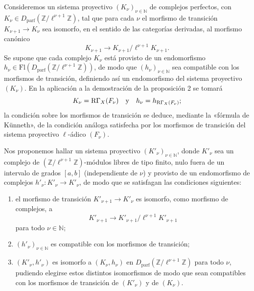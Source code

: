 Consideremos un sistema proyectivo $(K_\nu)_{\nu\in\mathbb N}$ de complejos perfectos, con $K_\nu\in D_{\mathrm{parf}}(\mathbb Z/\ell^{\nu+1}\mathbb Z)$, tal que para cada $\nu$ el morfismo de transición $K_{\nu+1}\to K_\nu$ sea isomorfo, en el sentido de las categorías derivadas, al morfismo canónico
\[
K_{\nu+1}\to K_{\nu+1}/\ell^{\nu+1}K_{\nu+1}.
\]
Se supone que cada complejo $K_\nu$ está provisto de un endomorfismo $h_\nu\in\mathrm{Fl}(D_{\mathrm{parf}}(\mathbb Z/\ell^{\nu+1}\mathbb Z))$, de modo que $(h_\nu)_{\nu\in\mathbb N}$ sea compatible con los morfismos de transición, definiendo así un endomorfismo del sistema proyectivo $(K_\nu)$. En la aplicación a la demostración de la proposición 2 se tomará
\[
K_\nu=\mathrm{R}\Gamma_X(F_\nu)\quad\text{y}\quad h_\nu=h_{\mathrm{R}\Gamma_X(F_\nu)};
\]
la condición sobre los morfismos de transición se deduce, mediante la «fórmula de Künneth», de la condición análoga satisfecha por los morfismos de transición del sistema proyectivo $\ell$-ádico $(F_\nu)$.

Nos proponemos hallar un sistema proyectivo $(K'_\nu)_{\nu\in\mathbb N}$, donde $K'_\nu$ sea un complejo de $(\mathbb Z/\ell^{\nu+1}\mathbb Z)$-módulos libres de tipo finito, nulo fuera de un intervalo de grados $[a,b]$ (independiente de $\nu$) y provisto de un endomorfismo de complejos $h'_\nu:K'_\nu\to K'_\nu$, de modo que se satisfagan las condiciones siguientes:
\begin{enumerate}[label=\arabic*)]
\item el morfismo de transición $K'_{\nu+1}\to K'_\nu$ es isomorfo, como morfismo de complejos, a
\[
K'_{\nu+1}\to K'_{\nu+1}/\ell^{\nu+1}K'_{\nu+1}
\]
para todo $\nu\in\mathbb N$;
\item $(h'_\nu)_{\nu\in\mathbb N}$ es compatible con los morfismos de transición;
\item $(K'_\nu,h'_\nu)$ es isomorfo a $(K_\nu,h_\nu)$ en $D_{\mathrm{parf}}(\mathbb Z/\ell^{\nu+1}\mathbb Z)$ para todo $\nu$, pudiendo elegirse estos distintos isomorfismos de modo que sean compatibles con los morfismos de transición de $(K'_\nu)$ y de $(K_\nu)$.
\end{enumerate}
